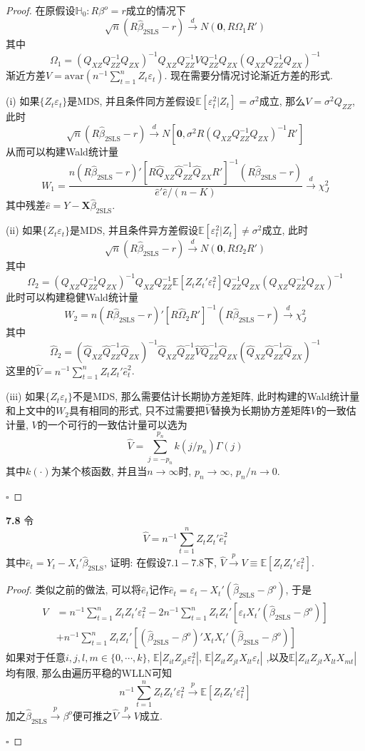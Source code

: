 \documentclass[cn,12pt,math=mtpro2,citestyle=gb7714-2015,bibstyle=gb7714-2015,twocol,mode=simple]{elegantbook}
\newcommand{\HH}{\mathbb{H}}
\newcommand{\E}{\mathbb{E}}
\newcommand{\btls}{\hat{\beta}_{\text{2SLS}}}
\newcommand{\QXZ}{\hat{Q}_{XZ}}
\newcommand{\QZZ}{\hat{Q}_{ZZ}}
\newcommand{\QZX}{\hat{Q}_{ZX}}
\begin{document}
\begin{proof}
  在原假设$\HH_0: R\beta^o=r$成立的情况下
  $$\sqrt{n}(R\btls-r)\xrightarrow{d} N(\mathbf{0}, R\Omega_1 R')$$
  其中
  $$\Omega_1=(Q_{XZ}Q_{ZZ}^{-1}Q_{ZX})^{-1}Q_{XZ}Q_{ZZ}^{-1}VQ_{ZZ}^{-1}Q_{ZX}(Q_{XZ}Q_{ZZ}^{-1}Q_{ZX})^{-1}$$
  渐近方差$\displaystyle V=\text{avar}\left(n^{-1}\sum_{t=1}^{n}Z_t\varepsilon_t\right)$. 现在需要分情况讨论渐近方差的形式.

  (i) 如果$\{Z_t\varepsilon_t\}$是MDS, 并且条件同方差假设$\E[\varepsilon_t^2|Z_t]=\sigma^2$成立, 那么$V=\sigma^2Q_{ZZ}$, 此时
  $$\sqrt{n}(R\btls-r)\xrightarrow{d}N[\mathbf{0},\sigma^2R(Q_{XZ}Q_{ZZ}^{-1}Q_{ZX})^{-1}R']$$
  从而可以构建Wald统计量
  $$W_1=\frac{n(R\btls-r)'[R\hat{Q}_{XZ}\hat{Q}_{ZZ}^{-1}\hat{Q}_{ZX}R']^{-1}(R\btls-r)}{\hat{e}'\hat{e}/(n-K)}\xrightarrow{d}\chi_J^2$$
  其中残差$\hat{e}=Y-\mathbf{X}\btls$.

  (ii) 如果$\{Z_t\varepsilon_t\}$是MDS, 并且条件异方差假设$\E[\varepsilon_t^2|Z_t]\neq\sigma^2$成立, 此时
  $$\sqrt{n}(R\btls-r)\xrightarrow{d} N(\mathbf{0}, R\Omega_2 R')$$
  其中
  $$\Omega_2=(Q_{XZ}Q_{ZZ}^{-1}Q_{ZX})^{-1}Q_{XZ}Q_{ZZ}^{-1}\E[Z_tZ_t'\varepsilon_t^2]Q_{ZZ}^{-1}Q_{ZX}(Q_{XZ}Q_{ZZ}^{-1}Q_{ZX})^{-1}$$
  此时可以构建稳健Wald统计量
  $$W_2=n(R\btls-r)'[R\hat{\Omega}_2R']^{-1}(R\btls-r)\xrightarrow{d}\chi_J^2$$
  其中
  $$\hat{\Omega}_2=(\QXZ\QZZ^{-1}\QZX)^{-1}\QXZ\QZZ^{-1}\hat{V}\QZZ^{-1}\QZX(\QXZ\QZZ^{-1}\QZX)^{-1}$$
  这里的$\displaystyle \hat{V}=n^{-1}\sum_{t=1}^{n}Z_tZ_t'\hat{e}_t^2$.

  (iii) 如果$\{Z_t\varepsilon_t\}$不是MDS, 那么需要估计长期协方差矩阵, 此时构建的Wald统计量和上文中的$W_2$具有相同的形式, 只不过需要把$\hat{V}$替换为长期协方差矩阵$V$的一致估计量, $V$的一个可行的一致估计量可以选为
  $$\hat{V}=\sum_{j=-p_n}^{p_n}k(j/p_n)\hat{\Gamma}(j)$$
  其中$k(\cdot)$为某个核函数, 并且当$n\to\infty$时, $p_n\to\infty$, $p_n/n\to0$.

$\square$
\end{proof}

\textbf{7.8} 令
$$\hat{V}=n^{-1}\sum_{t=1}^{n}Z_tZ_t'\hat{e}_t^2$$
其中$\hat{e}_t=Y_t-X_t'\btls$, 证明: 在假设$7.1-7.8$下, $\hat{V}\xrightarrow{p}V\equiv \E[Z_tZ_t'\varepsilon_t^2]$.

\begin{proof}
  类似之前的做法, 可以将$\hat{e}_t$记作$\hat{e}_t=\varepsilon_t-X_t'(\btls-\beta^o)$, 于是
  \begin{align*}
  V&=n^{-1}\sum_{t=1}^{n}Z_tZ_t'\varepsilon_t^2-2n^{-1}\sum_{t=1}^{n}Z_tZ_t'[\varepsilon_tX_t'(\btls-\beta^o)] \\
  &+n^{-1}\sum_{t=1}^{n}Z_tZ_t'[(\btls-\beta^o)'X_tX_t'(\btls-\beta^o)]
  \end{align*}
  如果对于任意$i, j, l, m\in\{0,\cdots,k\}$, $\E|Z_{it}Z_{jt}\varepsilon_t^2|$, $\E|Z_{it}Z_{jt}X_{lt}\varepsilon_t|$ ,以及$\E|Z_{it}Z_{jt}X_{lt}X_{mt}|$均有限, 那么由遍历平稳的WLLN可知
  $$n^{-1}\sum_{t=1}^{n}Z_tZ_t'\varepsilon_t^2\xrightarrow{p}\E[Z_tZ_t'\varepsilon_t^2]$$
  加之$\btls\xrightarrow{p}\beta^o$便可推之$\hat{V}\xrightarrow{p} V$成立.

  $\square$
\end{proof}
\end{document}
